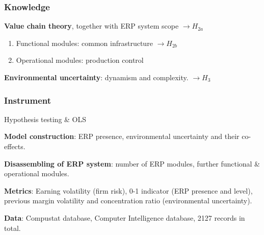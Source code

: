 \documentclass{../presentation}
\begin{document}
    \begin{frame}
        \frametitle{Knowledge}

        \textbf{Value chain theory}, together with ERP system scope $\rightarrow H_{2a}$

        \begin{enumerate}
            \item Functional modules: common infrastructure $\rightarrow H_{2b}$
            \item Operational modules: production control
        \end{enumerate}

        \textbf{Environmental uncertainty}: dynamism and complexity. $\rightarrow H_3$

    \end{frame}

    \begin{frame}
        \frametitle{Instrument}

        Hypothesis testing \& OLS

        \textbf{Model construction}: ERP presence, environmental uncertainty and their co-effects.

        \textbf{Disassembling of ERP system}: number of ERP modules, further functional \& operational modules.

        \textbf{Metrics}: Earning volatility (firm risk), 0-1 indicator (ERP presence and level), previous margin volatility and concentration ratio (environmental uncertainty).

        \textbf{Data}: Compustat database, Computer Intelligence database, 2127 records in total.

    \end{frame}
\end{document}
